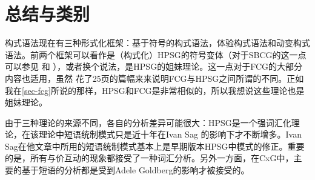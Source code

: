 \section{总结与类别}

\begin{sloppypar}
构式语法现在有三种形式化框架：基于符号的构式语法，体验构式语法和动变构式语法。前两个框架可以看作是（构式化）HPSG\indexhpsgc  的符号变体（对于SBCG的这一点可以参见 和 ），或者换个说法，是HPSG的姐妹理论。这一点对于FCG的大部分内容也适用，虽然 \citet{vanTrijp2013a}花了25页的篇幅来来说明FCG与HPSG之间所谓的不同。正如我在\ref{sec-fcg}所说的那样，HPSG和FCG是非常相似的，所以我想说这些理论也是姐妹理论。
\end{sloppypar}

由于三种理论的来源不同，各自的分析差异可能很大：HPSG是一个强词汇化理论，在该理论中短语统制模式只是近十年在Ivan Sag 的影响下才不断增多。Ivan Sag在他文章中所用的短语统制模式基本上是早期版本HPSG中模式的修正。重要的是，所有与价互动的现象都接受了一种词汇分析\citep*[\S~2.3]{SBK2012a}。另外一方面，在CxG中，主要的基于短语的分析都是受到Adele Goldberg的影响才被接受的。

